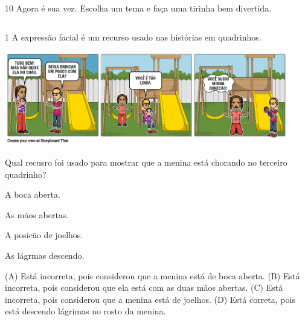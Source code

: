\num{10} Agora é sua vez. Escolha um tema e faça uma tirinha bem divertida.

\begin{longtable}[]{@{}ll@{}}
\toprule
&\tabularnewline
\bottomrule
\end{longtable}


\num{1} A expressão facial é um recurso usado nas histórias em quadrinhos.

\includegraphics[width=4.88436in,height=1.61667in]{media/image136.png}


Qual recusro foi usado para mostrar que a menina está chorando no
terceiro quadrinho?

\begin{minipage}{.5\textwidth}
\begin{escolha}
\item A boca aberta.

\item As mãos abertas.

\item A posicão de joelhos.

\item As lágrmas descendo.
\end{escolha}
\end{minipage}

(A) Está incorreta, pois considerou que a menina está de boca aberta.
(B) Está incorreta, pois considerou que ela está com as duas mãos abertas.
(C) Está incorreta, pois considerou que a menina está de joelhos.
(D) Está correta, pois está descendo lágrimas no rosto da menina.

